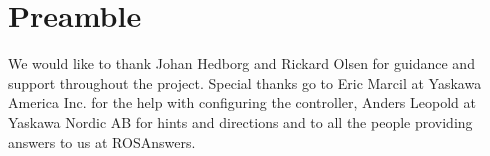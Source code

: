 
\section*{Preamble}

We would like to thank Johan Hedborg and Rickard Olsen for guidance and support throughout the project.  Special thanks go to Eric Marcil at Yaskawa America Inc. for the help with configuring the controller, Anders Leopold at Yaskawa Nordic AB for hints and directions and to all the people providing answers to us at ROSAnswers\cite{RosAnswers}.